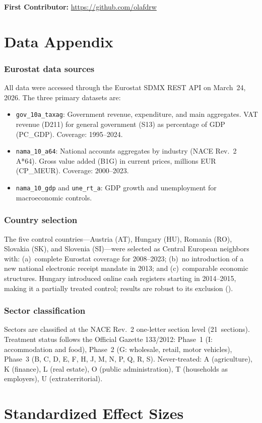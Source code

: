 \documentclass[12pt]{article}
\begin{document}
\noindent\textbf{First Contributor:} \url{https://github.com/olafdrw}

\label{apep_main_text_end}
\newpage


\newpage
\appendix

\section{Data Appendix}
\label{app:data}

\subsubsection*{Eurostat data sources}  All data were accessed through the Eurostat SDMX REST API on March~24, 2026. The three primary datasets are:

\begin{itemize}
\item \texttt{gov\_10a\_taxag}: Government revenue, expenditure, and main aggregates. VAT revenue (D211) for general government (S13) as percentage of GDP (PC\_GDP). Coverage: 1995--2024.
\item \texttt{nama\_10\_a64}: National accounts aggregates by industry (NACE Rev.~2 A*64). Gross value added (B1G) in current prices, millions EUR (CP\_MEUR). Coverage: 2000--2023.
\item \texttt{nama\_10\_gdp} and \texttt{une\_rt\_a}: GDP growth and unemployment for macroeconomic controls.
\end{itemize}

\subsubsection*{Country selection}  The five control countries---Austria (AT), Hungary (HU), Romania (RO), Slovakia (SK), and Slovenia (SI)---were selected as Central European neighbors with: (a)~complete Eurostat coverage for 2008--2023; (b)~no introduction of a new national electronic receipt mandate in 2013; and (c)~comparable economic structures. Hungary introduced online cash registers starting in 2014--2015, making it a partially treated control; results are robust to its exclusion ().

\subsubsection*{Sector classification}  Sectors are classified at the NACE Rev.~2 one-letter section level (21~sections). Treatment status follows the Official Gazette 133/2012: Phase~1 (I: accommodation and food), Phase~2 (G: wholesale, retail, motor vehicles), Phase~3 (B, C, D, E, F, H, J, M, N, P, Q, R, S). Never-treated: A (agriculture), K (finance), L (real estate), O (public administration), T (households as employers), U (extraterritorial).


\section{Standardized Effect Sizes}
\label{sec:sde}


\end{document}

